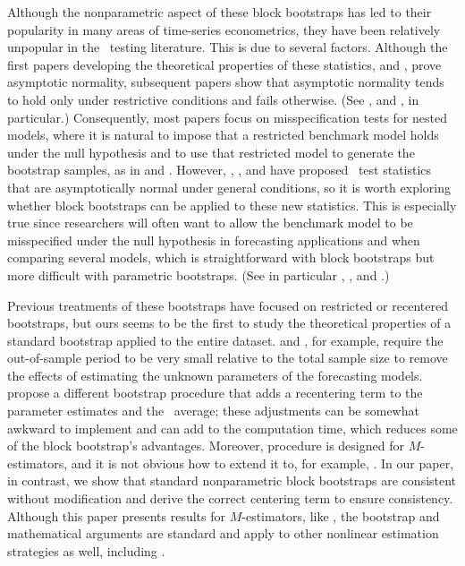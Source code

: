 \documentclass[12pt,fleqn]{article}
\begin{document}
Although the nonparametric aspect of these block bootstraps has led to
their popularity in many areas of time-series econometrics, they have
been relatively unpopular in the \oos\ testing literature. This is due
to several factors. Although the first papers developing the
theoretical properties of these statistics, \cite{DiM:95} and
\cite{Wes:96}, prove asymptotic normality, subsequent papers show that
asymptotic normality tends to hold only under restrictive conditions
and fails otherwise. (See \citealp{ClM:01}, and \citealp{Mcc:07}, in
particular.) Consequently, most papers focus on misspecification tests
for nested models, where it is natural to impose that a restricted
benchmark model holds under the null hypothesis and to use that
restricted model to generate the bootstrap samples, as in
\cite{Lut:99} and \cite{ClM:05}.
However, \cite{GiW:06}, \cite{ClW:06,ClW:07}, and \cite{Cal:15} have
proposed \oos\ test statistics that are asymptotically normal under
general conditions, so it is worth exploring whether block bootstraps
can be applied to these new statistics. This is especially true since
researchers will often want to allow the benchmark model to be
misspecified under the null hypothesis in forecasting applications and
when comparing several models, which is straightforward with block
bootstraps but more difficult with parametric bootstraps. (See in
particular \citealp{Whi:00}, \citealp{Han:05}, and \citealp{RoW:05}.)

Previous treatments of these bootstraps have focused on restricted or
recentered bootstraps, but ours seems to be the first to study the
theoretical properties of a standard bootstrap applied to the entire
dataset. \citet{Whi:00} and \citet{Han:05}, for example, require the
out-of-sample period to be very small relative to the total sample
size to remove the effects of estimating the unknown parameters of the
forecasting models. \cite{CoS:07} propose a different bootstrap
procedure that adds a recentering term to the parameter estimates and
the \oos\ average; these adjustments can be somewhat awkward to
implement and can add to the computation time, which reduces some of
the block bootstrap's advantages. Moreover,  procedure
is designed for $M$-estimators, and it is not obvious how to extend it
to, for example, \gmm. In our paper, in contrast, we show that standard
nonparametric block bootstraps are consistent without modification and
derive the correct centering term to ensure consistency. Although this
paper presents results for $M$-estimators, like , the
bootstrap and mathematical arguments are standard and apply to other
nonlinear estimation strategies as well, including \gmm.
\end{document}
